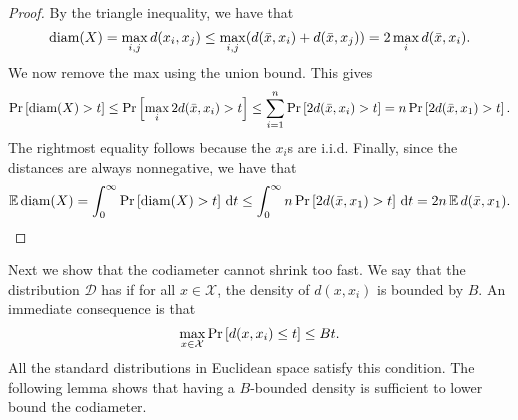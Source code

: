 \documentclass[thesis.tex]{subfiles}
\newcommand{\set}[1]{\mathcal {#1}}
\newcommand{\distribution}[1]{\mathcal {#1}}
\newcommand{\dist}[2]{\distf({#1},{#2})}
\newcommand{\distf}{d}
\newcommand{\diam}[1]{\textnormal{diam}({#1})}
\begin{document}
\begin{proof}
    By the triangle inequality, we have that
    \begin{equation*}
        \diam{X}
        = 
        \max_{i,j} \dist{x_i}{x_j}
        \le
        \max_{i,j} (\dist{\bar x}{x_i} + \dist{\bar x}{x_j})
        =
        2\max_i \dist{\bar x}{x_i}
        .
    \end{equation*}
    We now remove the max using the union bound.
    This gives
    \begin{equation*}
        \prob{\diam{X} > t}
        \le
        \prob{\max_i 2\dist{\bar x}{x_i} > t}
        \le
        \sum_{i=1}^n\prob{2\dist{\bar x}{x_i} > t}
        \label{eq:Ediamub}
        =
        n\prob{2\dist{\bar x}{x_1} > t}
        .
    \end{equation*}
    The rightmost equality follows because the $x_i$s are i.i.d.
    Finally, since the distances are always nonnegative, we have that
    \begin{equation*}
        \E\diam{X} 
        = 
        \int_0^\infty \prob{\diam{X} > t} \dd t
        \le
        \int_0^\infty n\prob{2\dist{\bar x}{x_1} > t} \dd t
        =
        2n \E\dist{\bar x}{x_1}
        .
    \end{equation*}
\end{proof}


Next we show that the codiameter cannot shrink too fast.
We say that the distribution $\distribution D$ has  if
for all $x\in\set X$, the density of $\dist{x}{x_i}$ is bounded by $B$.
An immediate consequence is that 
\begin{equation}
    \max_{x\in\set X} \prob{\dist{x}{x_i} \le t} \le Bt
    .
\end{equation}
All the standard distributions in Euclidean space satisfy this condition.
The following lemma shows that having a $B$-bounded density is sufficient to lower bound the codiameter.
\end{document}
